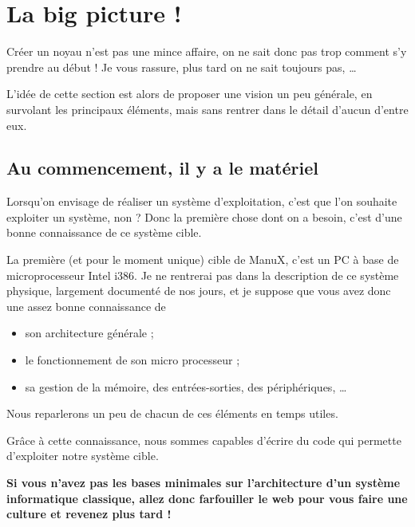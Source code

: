 %
\section{La big picture !}

   Créer un noyau n'est pas une mince affaire, on ne sait donc pas
trop comment s'y prendre au début ! Je vous rassure, plus tard on ne
sait toujours pas, \ldots


   L’idée de cette section est alors de proposer une vision un peu
générale, en survolant les principaux éléments, mais sans rentrer dans
le détail d'aucun d'entre eux.

%
\subsection{Au commencement, il y a le matériel}

   Lorsqu'on envisage de réaliser un système d’exploitation, c'est que
l'on souhaite exploiter un système, non ? Donc la  première chose dont
on a besoin, c'est d'une bonne connaissance de ce système cible.

   La première (et pour le moment unique) cible de ManuX, c'est un PC
à base de microprocesseur Intel i386. Je ne rentrerai pas dans la
description de ce système physique, largement documenté de nos jours,
et je suppose que vous avez donc une assez bonne connaissance de

\begin{itemize}
   \item son architecture générale ;
   \item le fonctionnement de son micro processeur ;
   \item sa gestion de la mémoire, des entrées-sorties, des
     périphériques, \ldots
\end{itemize}

   Nous reparlerons un peu de chacun de ces éléments en temps utiles.

   Grâce à cette connaissance, nous sommes capables d'écrire du code
qui permette d'exploiter notre système cible.

{\bf Si vous n'avez pas les bases minimales sur l'architecture d'un
  système informatique classique, allez donc farfouiller le web pour
  vous faire une culture et revenez plus tard !}

